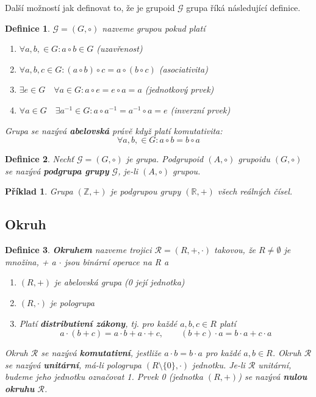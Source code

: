 \documentclass[12pt,a4paper]{article}
\newtheorem{definition}{Definice}
\newtheorem{example}{Příklad}
\begin{document}
Další možností jak definovat to, že je grupoid $\mathscr{G}$ grupa říká následující definice.
\begin{definition}
	 $\mathscr{G} = (G, \circ)$  nazveme grupou pokud platí
	\begin{enumerate}
		\item $\forall a,b, \in G : a \circ b \in G$ (uzavřenost)
		\item $\forall a,b,c \in G : (a \circ b) \circ c = a \circ (b \circ c)$ (asociativita)
		\item $\exists e \in G \quad \forall a \in G : a \circ e = e \circ a = a$ (jednotkový prvek)
		\item $\forall a \in G \quad \exists a^{-1} \in G : a \circ a^{-1} = a^{-1} \circ a = e$ (inverzní prvek)
	\end{enumerate}
	Grupa se nazývá \textbf{abelovská} právě když platí komutativita: $$\forall a,b, \in G : a \circ b = b \circ a$$
\end{definition}

\begin{definition}
	Nechť $\mathscr{G} = (G, \circ)$ je grupa. Podgrupoid $(A, \circ)$ grupoidu $(G, \circ)$ se nazývá \textbf{podgrupa grupy} $\mathscr{G}$, je-li $(A, \circ)$ grupou.
\end{definition}

\begin{example}
	Grupa $(\mathbb{Z}, +)$ je podgrupou grupy $(\mathbb{R}, +)$ všech reálných čísel.
\end{example}

\subsection{Okruh}
\begin{definition}
	\textbf{Okruhem} nazveme trojici $\mathscr{R} = (R, + , \cdot)$ takovou, že $R \not= \emptyset$ je množina, + a $\cdot$ jsou binární operace na R a
	\begin{enumerate}
		\item $(R, +)$ je abelovská grupa (0 její jednotka)
		\item $(R, \cdot)$ je pologrupa
		\item Platí \textbf{distributivní zákony}, tj. pro každé $a,b,c \in R$ platí $$a \cdot (b + c) = a \cdot b + a \cdot +\ c, \qquad (b + c) \cdot a = b \cdot a + c \cdot a$$
	\end{enumerate}
	Okruh $\mathscr{R}$ se nazývá \textbf{komutativní}, jestliže $ a \cdot b = b \cdot a$ pro každé $a,b \in R$. Okruh $\mathscr{R}$ se nazývá \textbf{unitární}, má-li pologrupa $(R \setminus \{0\}, \cdot)$ jednotku. Je-li $\mathscr{R}$ unitární, budeme jeho jednotku označovat 1. Prvek 0 (jednotka $(R, +)$) se nazývá \textbf{nulou okruhu} $\mathscr{R}$.
\end{definition}
\end{document}
